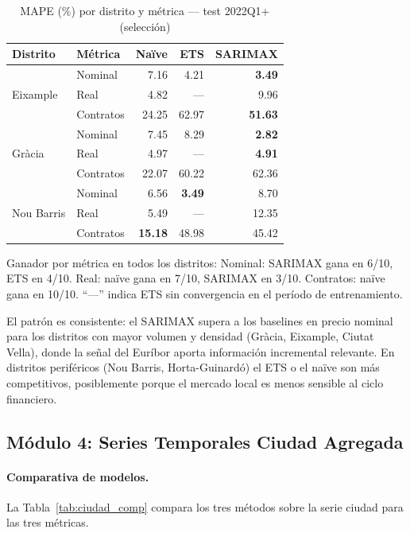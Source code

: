 \documentclass[12pt,a4paper]{article}
\begin{document}
\begin{table}[H]
\caption{MAPE (\%) por distrito y métrica --- test 2022Q1+ (selección)}
\label{tab:mape_distrito}
\centering
\small
\begin{threeparttable}
\begin{tabular}{llrrr}
\toprule
Distrito & Métrica & Naïve & ETS & SARIMAX \\
\midrule
\multirow{3}{*}{Eixample}
  & Nominal  & 7.16 & 4.21 & \textbf{3.49} \\
  & Real     & 4.82 & ---  & 9.96 \\
  & Contratos& 24.25& 62.97& \textbf{51.63} \\
\midrule
\multirow{3}{*}{Gràcia}
  & Nominal  & 7.45 & 8.29 & \textbf{2.82} \\
  & Real     & 4.97 & ---  & \textbf{4.91} \\
  & Contratos& 22.07& 60.22& 62.36 \\
\midrule
\multirow{3}{*}{Nou Barris}
  & Nominal  & 6.56 & \textbf{3.49} & 8.70 \\
  & Real     & 5.49 & ---  & 12.35 \\
  & Contratos& \textbf{15.18}& 48.98& 45.42 \\
\bottomrule
\end{tabular}
\begin{tablenotes}
\small\item Ganador por métrica en todos los distritos:
Nominal: SARIMAX gana en 6/10, ETS en 4/10. Real: naïve gana en 7/10, SARIMAX en 3/10.
Contratos: naïve gana en 10/10. ``---'' indica ETS sin convergencia en el período de entrenamiento.
\end{tablenotes}
\end{threeparttable}
\end{table}

El patrón es consistente: el SARIMAX supera a los baselines en precio nominal para los
distritos con mayor volumen y densidad (Gràcia, Eixample, Ciutat Vella), donde la señal
del Euríbor aporta información incremental relevante. En distritos periféricos (Nou Barris,
Horta-Guinardó) el ETS o el naïve son más competitivos, posiblemente porque el mercado
local es menos sensible al ciclo financiero.

\subsection{Módulo 4: Series Temporales Ciudad Agregada}

\paragraph{Comparativa de modelos.} La Tabla~\ref{tab:ciudad_comp} compara los tres
métodos sobre la serie ciudad para las tres métricas.
\end{document}
